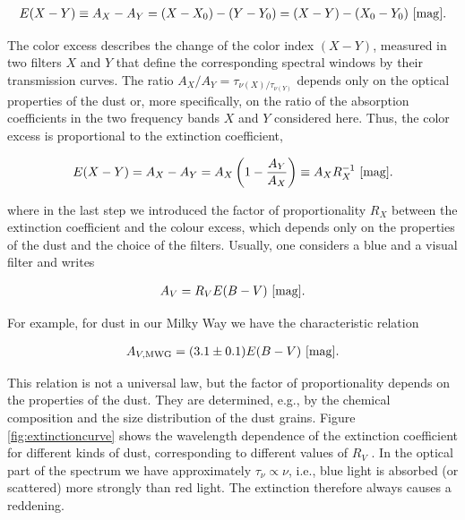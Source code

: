 \documentclass[a4paper,11pt]{article}
\begin{document}
\begin{align*}
    E(X-Y) \equiv A_X-A_Y = (X-X_0)-(Y-Y_0) = (X-Y)-(X_0-Y_0) ~ [{\rm mag}].
\end{align*}

{\noindent}The color excess describes the change of the color index $(X-Y)$, measured in two filters $X$ and $Y$ that define the corresponding spectral windows by their transmission curves. The ratio $A_X/A_Y=\tau_{\nu(X)/\tau_{\nu(Y)}}$ depends only on the optical properties of the dust or, more specifically, on the ratio of the absorption coefficients in the two frequency bands $X$ and $Y$ considered here. Thus, the color excess is proportional to the extinction coefficient,

\begin{align*}
    E(X-Y) = A_X-A_Y = A_X\left(1-\frac{A_Y}{A_X}\right) \equiv A_XR_X^{-1} ~ [{\rm mag}].
\end{align*}

{\noindent}where in the last step we introduced the factor of proportionality $R_X$ between the extinction coefficient and the colour excess, which depends only on the properties of the dust and the choice of the filters. Usually, one considers a blue and a visual filter and writes

\begin{align*}
    A_V = R_V E(B-V) ~ [{\rm mag}].
\end{align*}

{\noindent}For example, for dust in our Milky Way we have the characteristic relation

\begin{align*}
    A_{V,\mathrm{MWG}} = (3.1\pm0.1)E(B-V) ~ [{\rm mag}].
\end{align*}

{\noindent}This relation is not a universal law, but the factor of proportionality depends on the properties of the dust. They are determined, e.g., by the chemical composition and the size distribution of the dust grains. Figure \ref{fig:extinctioncurve} shows the wavelength dependence of the extinction coefficient for different kinds of dust, corresponding to different values of $R_V$ . In the optical part of the spectrum we have approximately $\tau_\nu\propto\nu$, i.e., blue light is absorbed (or scattered) more strongly than red light. The extinction therefore always causes a reddening.
\end{document}

